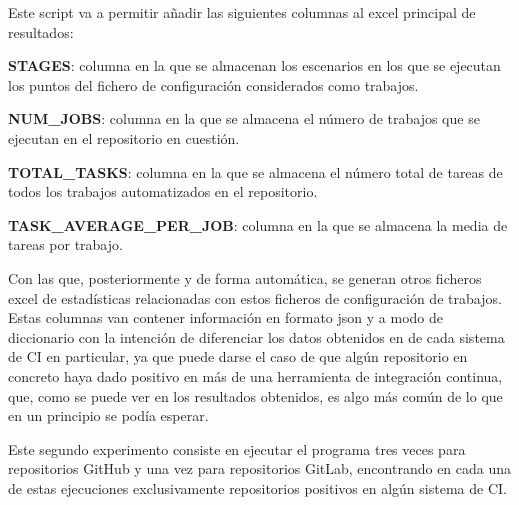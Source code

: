 Este script va a permitir añadir las siguientes columnas al excel principal de resultados:
\begin{compactitem}
    \item \textbf{STAGES}: columna en la que se almacenan los escenarios en los que se ejecutan los puntos del fichero de configuración considerados como trabajos.
    \item \textbf{NUM\_JOBS}: columna en la que se almacena el número de trabajos que se ejecutan en el repositorio en cuestión.
    \item \textbf{TOTAL\_TASKS}: columna en la que se almacena el número total de tareas de todos los trabajos automatizados en el repositorio.
    \item \textbf{TASK\_AVERAGE\_PER\_JOB}: columna en la que se almacena la media de tareas por trabajo.
\end{compactitem}

Con las que, posteriormente y de forma automática, se generan otros ficheros excel de estadísticas relacionadas con estos ficheros de configuración de trabajos. Estas columnas van contener información en formato json y a modo de diccionario con la intención de diferenciar los datos obtenidos en de cada sistema de CI en particular, ya que puede darse el caso de que algún repositorio en concreto haya dado positivo en más de una herramienta de integración continua, que, como se puede ver en los resultados obtenidos, es algo más común de lo que en un principio se podía esperar.

Este segundo experimento consiste en ejecutar el programa tres veces para repositorios GitHub y una vez para repositorios GitLab, encontrando en cada una de estas ejecuciones exclusivamente repositorios positivos en algún sistema de CI. 

